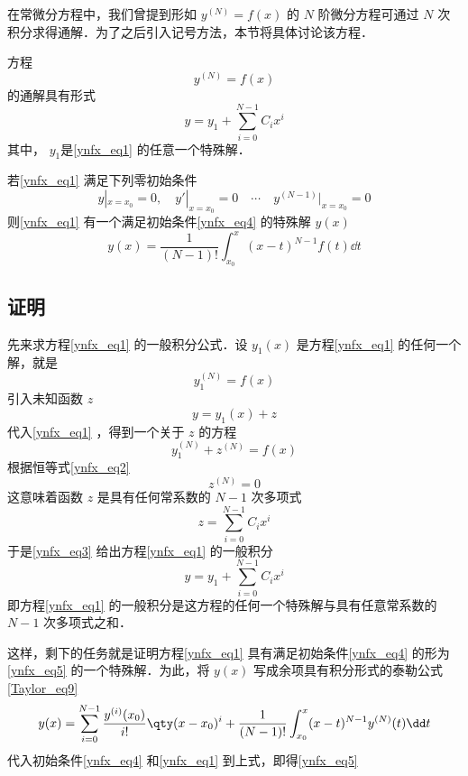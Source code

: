 在常微分方程中，我们曾提到形如 $y^{(N)}=f(x)$ 的 $N$ 阶微分方程可通过 $N$ 次积分求得通解．为了之后引入记号方法，本节将具体讨论该方程．

方程
\begin{equation}\label{ynfx_eq1}
y^{(N)}=f(x)
\end{equation}
的通解具有形式
\begin{equation}
y=y_1+\sum_{i=0}^{N-1}C_ix^i
\end{equation}
其中， $y_1$是\autoref{ynfx_eq1} 的任意一个特殊解．

若\autoref{ynfx_eq1} 满足下列零初始条件
\begin{equation}\label{ynfx_eq4}
y|_{x=x_0}=0,\quad y'|_{x=x_0}=0\quad\cdots \quad y^{(N-1)}|_{x=x_0}=0
\end{equation}
则\autoref{ynfx_eq1} 有一个满足初始条件\autoref{ynfx_eq4} 的特殊解 $y(x)$
\begin{equation}\label{ynfx_eq5}
y(x)=\frac{1}{(N-1)!}\int_{x_0}^x(x-t)^{N-1}f(t)\dd t
\end{equation}


\subsection{证明}
先来求方程\autoref{ynfx_eq1} 的一般积分公式．设 $y_1(x)$ 是方程\autoref{ynfx_eq1} 的任何一个解，就是
\begin{equation}\label{ynfx_eq2}
y_1^{(N)}=f(x)
\end{equation}
引入未知函数 $z$
\begin{equation}\label{ynfx_eq3}
y=y_1(x)+z
\end{equation}
代入\autoref{ynfx_eq1} ，得到一个关于 $z$ 的方程
\begin{equation}
y_1^{(N)}+z^{(N)}=f(x)
\end{equation}
根据恒等式\autoref{ynfx_eq2} 
\begin{equation}
z^{(N)}=0
\end{equation}
这意味着函数 $z$ 是具有任何常系数的 $N-1$ 次多项式
\begin{equation}
z=\sum_{i=0}^{N-1}C_ix^i
\end{equation}
于是\autoref{ynfx_eq3} 给出方程\autoref{ynfx_eq1} 的一般积分
\begin{equation}
y=y_1+\sum_{i=0}^{N-1}C_ix^i
\end{equation}
即方程\autoref{ynfx_eq1} 的一般积分是这方程的任何一个特殊解与具有任意常系数的 $N-1$ 次多项式之和．

这样，剩下的任务就是证明方程\autoref{ynfx_eq1} 具有满足初始条件\autoref{ynfx_eq4} 的形为\autoref{ynfx_eq5} 的一个特殊解．为此，将 $y(x)$ 写成余项具有积分形式的泰勒公式\autoref{Taylor_eq9}~
\begin{equation}
y(x)=\sum_{i=0}^{N-1}\frac{y^{(i)}(x_0)}{i!}\qty(x-x_0)^{i}+\frac{1}{(N-1)!}\int_{x_0}^{x}(x-t)^{N-1}y^{(N)}(t)\dd t
\end{equation}
代入初始条件\autoref{ynfx_eq4} 和\autoref{ynfx_eq1} 到上式，即得\autoref{ynfx_eq5} 
